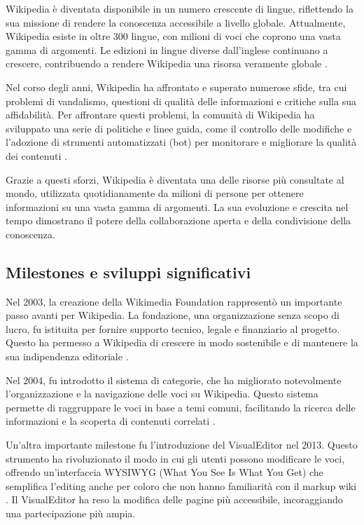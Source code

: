 \documentclass[12pt,a4paper]{report}
\begin{document}
Wikipedia è diventata disponibile in un numero crescente di lingue, riflettendo la sua missione di rendere la conoscenza accessibile a livello globale. Attualmente, Wikipedia esiste in oltre 300 lingue, con milioni di voci che coprono una vasta gamma di argomenti. Le edizioni in lingue diverse dall'inglese continuano a crescere, contribuendo a rendere Wikipedia una risorsa veramente globale \cite{reagle2010good}.

Nel corso degli anni, Wikipedia ha affrontato e superato numerose sfide, tra cui problemi di vandalismo, questioni di qualità delle informazioni e critiche sulla sua affidabilità. Per affrontare questi problemi, la comunità di Wikipedia ha sviluppato una serie di politiche e linee guida, come il controllo delle modifiche e l'adozione di strumenti automatizzati (bot) per monitorare e migliorare la qualità dei contenuti \cite{jemielniak2014wikipedia}.

Grazie a questi sforzi, Wikipedia è diventata una delle risorse più consultate al mondo, utilizzata quotidianamente da milioni di persone per ottenere informazioni su una vasta gamma di argomenti. La sua evoluzione e crescita nel tempo dimostrano il potere della collaborazione aperta e della condivisione della conoscenza.

\subsection{Milestones e sviluppi significativi}

Nel 2003, la creazione della Wikimedia Foundation rappresentò un importante passo avanti per Wikipedia. La fondazione, una organizzazione senza scopo di lucro, fu istituita per fornire supporto tecnico, legale e finanziario al progetto. Questo ha permesso a Wikipedia di crescere in modo sostenibile e di mantenere la sua indipendenza editoriale \cite{reagle2010good}.

Nel 2004, fu introdotto il sistema di categorie, che ha migliorato notevolmente l'organizzazione e la navigazione delle voci su Wikipedia. Questo sistema permette di raggruppare le voci in base a temi comuni, facilitando la ricerca delle informazioni e la scoperta di contenuti correlati \cite{jemielniak2014wikipedia}.

Un'altra importante milestone fu l'introduzione del VisualEditor nel 2013. Questo strumento ha rivoluzionato il modo in cui gli utenti possono modificare le voci, offrendo un'interfaccia WYSIWYG (What You See Is What You Get) che semplifica l'editing anche per coloro che non hanno familiarità con il markup wiki \cite{history_of_wikis}. Il VisualEditor ha reso la modifica delle pagine più accessibile, incoraggiando una partecipazione più ampia.
\end{document}
